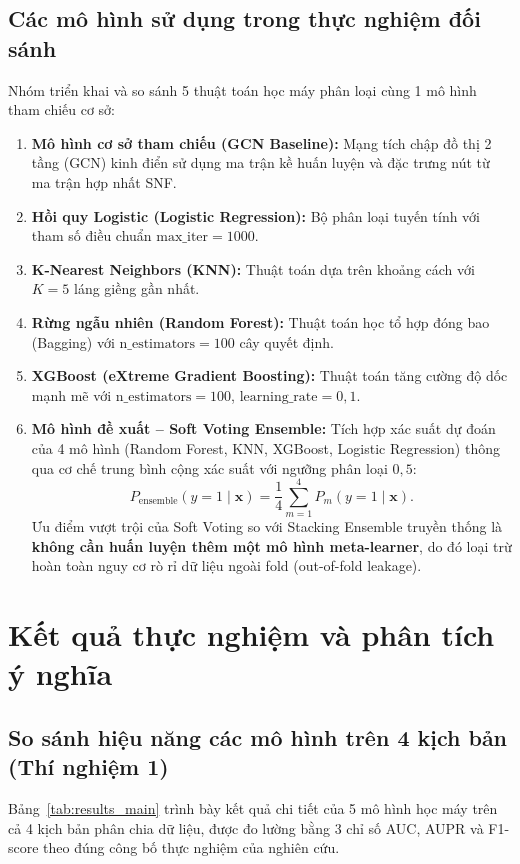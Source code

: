 \documentclass[12pt,a4paper,oneside]{report}
\begin{document}
\subsection{Các mô hình sử dụng trong thực nghiệm đối sánh}
Nhóm triển khai và so sánh 5 thuật toán học máy phân loại cùng 1 mô hình tham chiếu cơ sở:
\begin{enumerate}
  \item \textbf{Mô hình cơ sở tham chiếu (GCN Baseline):} Mạng tích chập đồ thị 2 tầng (GCN) kinh điển sử dụng ma trận kề huấn luyện và đặc trưng nút từ ma trận hợp nhất SNF.
  \item \textbf{Hồi quy Logistic (Logistic Regression):} Bộ phân loại tuyến tính với tham số điều chuẩn $\text{max\_iter} = 1000$.
  \item \textbf{K-Nearest Neighbors (KNN):} Thuật toán dựa trên khoảng cách với $K = 5$ láng giềng gần nhất.
  \item \textbf{Rừng ngẫu nhiên (Random Forest):} Thuật toán học tổ hợp đóng bao (Bagging) với $\text{n\_estimators} = 100$ cây quyết định.
  \item \textbf{XGBoost (eXtreme Gradient Boosting):} Thuật toán tăng cường độ dốc mạnh mẽ với $\text{n\_estimators} = 100$, $\text{learning\_rate} = 0{,}1$.
  \item \textbf{Mô hình đề xuất -- Soft Voting Ensemble:} Tích hợp xác suất dự đoán của 4 mô hình (Random Forest, KNN, XGBoost, Logistic Regression) thông qua cơ chế trung bình cộng xác suất với ngưỡng phân loại $0{,}5$:
  \begin{equation}
    P_{\text{ensemble}}(y=1 \mid \mathbf{x}) = \frac{1}{4} \sum_{m=1}^{4} P_m(y=1 \mid \mathbf{x}).
  \end{equation}
  Ưu điểm vượt trội của Soft Voting so với Stacking Ensemble truyền thống là \textbf{không cần huấn luyện thêm một mô hình meta-learner}, do đó loại trừ hoàn toàn nguy cơ rò rỉ dữ liệu ngoài fold (out-of-fold leakage).
\end{enumerate}

\section{Kết quả thực nghiệm và phân tích ý nghĩa}

\subsection{So sánh hiệu năng các mô hình trên 4 kịch bản (Thí nghiệm 1)}
Bảng~\ref{tab:results_main} trình bày kết quả chi tiết của 5 mô hình học máy trên cả 4 kịch bản phân chia dữ liệu, được đo lường bằng 3 chỉ số AUC, AUPR và F1-score theo đúng công bố thực nghiệm của nghiên cứu.
\end{document}
